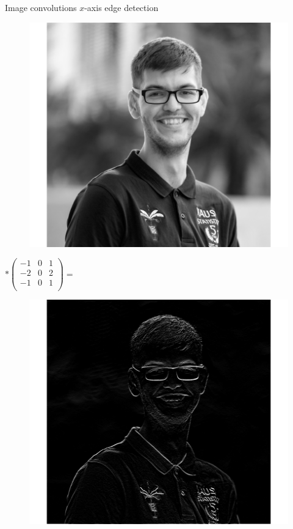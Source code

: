 \documentclass{beamer}
\begin{document}
\begin{frame}{Image convolutions}
$x$-axis edge detection

\begin{minipage}{0.32\linewidth}
\begin{figure}
\includegraphics[width=\linewidth]{Images/conv1.png}
\end{figure}

\end{minipage}
\begin{minipage}{0.32\linewidth}
$ * \begin{pmatrix}
-1& 0 & 1 \\
-2& 0 & 2 \\
-1& 0 & 1 \\
\end{pmatrix} =$
\end{minipage}
\begin{minipage}{0.32\linewidth}
\begin{figure}
\includegraphics[width=\linewidth]{Images/conv6.png}
\end{figure}
\end{minipage}
\end{frame}
\end{document}
